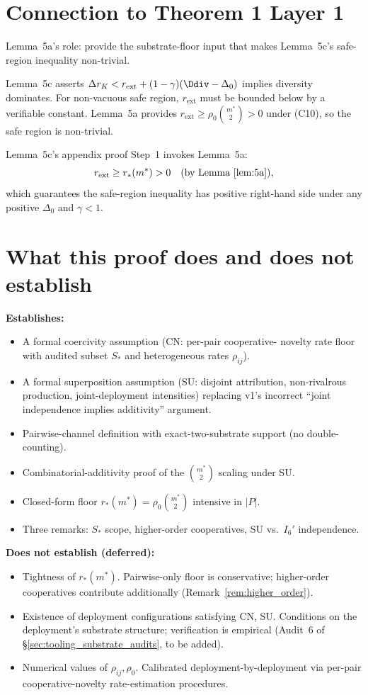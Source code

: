 \documentclass{article}
\newcommand{\rext}{r_{\mathrm{ext}}}
\newcommand{\Saudit}{S_*}
\begin{document}
\section{Connection to Theorem 1 Layer 1}

Lemma~5a's role: provide the substrate-floor input that makes
Lemma~5c's safe-region inequality non-trivial.

Lemma~5c asserts $\Delta r_K < \rext + (1-\gamma)(\Ddiv -
\Delta_0)$ implies diversity dominates.  For non-vacuous safe
region, $\rext$ must be bounded below by a verifiable constant.
Lemma~5a provides $\rext \geq \rho_0 \binom{m^*}{2} > 0$ under
(C10), so the safe region is non-trivial.

Lemma~5c's appendix proof Step~1 invokes Lemma~5a:
\[
  \rext \geq r_*(m^*) > 0 \quad \text{(by Lemma~\ref{lem:5a})},
\]
which guarantees the safe-region inequality has positive right-hand
side under any positive $\Delta_0$ and $\gamma < 1$.

\section{What this proof does and does not establish}

\textbf{Establishes:}
\begin{itemize}
\item A formal coercivity assumption (CN: per-pair cooperative-
  novelty rate floor with audited subset $\Saudit$ and
  heterogeneous rates $\rho_{ij}$).
\item A formal superposition assumption (SU: disjoint attribution,
  non-rivalrous production, joint-deployment intensities) replacing
  v1's incorrect ``joint independence implies additivity'' argument.
\item Pairwise-channel definition with exact-two-substrate support
  (no double-counting).
\item Combinatorial-additivity proof of the $\binom{m^*}{2}$
  scaling under SU.
\item Closed-form floor $r_*(m^*) = \rho_0 \binom{m^*}{2}$
  intensive in $|P|$.
\item Three remarks: $\Saudit$ scope, higher-order cooperatives,
  SU vs.\ $I_6'$ independence.
\end{itemize}

\textbf{Does not establish (deferred):}
\begin{itemize}
\item Tightness of $r_*(m^*)$.  Pairwise-only floor is conservative;
  higher-order cooperatives contribute additionally
  (Remark~\ref{rem:higher_order}).
\item Existence of deployment configurations satisfying CN, SU.
  Conditions on the deployment's substrate structure;
  verification is empirical (Audit~6 of
  \S\ref{sec:tooling_substrate_audits}, to be added).
\item Numerical values of $\rho_{ij}, \rho_0$.  Calibrated
  deployment-by-deployment via per-pair cooperative-novelty
  rate-estimation procedures.
\end{itemize}
\end{document}
